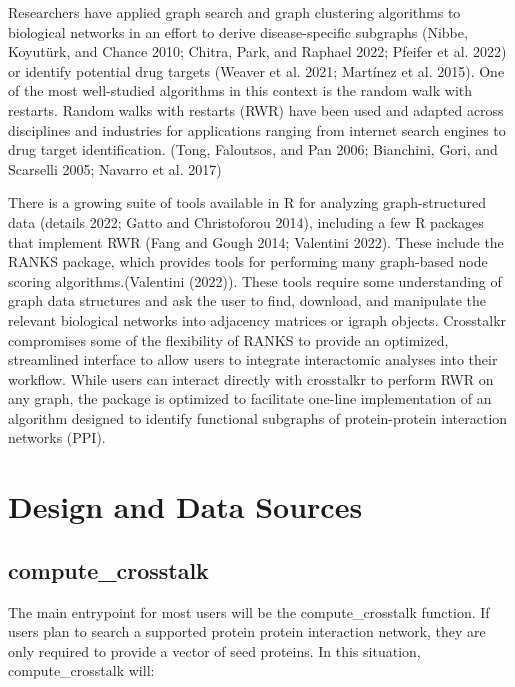 \documentclass{article}
\begin{document}
Researchers have applied graph search and graph clustering algorithms to
biological networks in an effort to derive disease-specific subgraphs
(Nibbe, Koyutürk, and Chance 2010; Chitra, Park, and Raphael 2022;
Pfeifer et al. 2022) or identify potential drug targets (Weaver et al.
2021; Martínez et al. 2015). One of the most well-studied algorithms in
this context is the random walk with restarts. Random walks with
restarts (RWR) have been used and adapted across disciplines and
industries for applications ranging from internet search engines to drug
target identification. (Tong, Faloutsos, and Pan 2006; Bianchini, Gori,
and Scarselli 2005; Navarro et al. 2017)

There is a growing suite of tools available in R for analyzing
graph-structured data (details 2022; Gatto and Christoforou 2014),
including a few R packages that implement RWR (Fang and Gough 2014;
Valentini 2022). These include the RANKS package, which provides tools
for performing many graph-based node scoring algorithms.(Valentini
(2022)). These tools require some understanding of graph data structures
and ask the user to find, download, and manipulate the relevant
biological networks into adjacency matrices or igraph objects.
Crosstalkr compromises some of the flexibility of RANKS to provide an
optimized, streamlined interface to allow users to integrate
interactomic analyses into their workflow. While users can interact
directly with crosstalkr to perform RWR on any graph, the package is
optimized to facilitate one-line implementation of an algorithm designed
to identify functional subgraphs of protein-protein interaction networks
(PPI).

\hypertarget{design-and-data-sources}{%
\section{Design and Data Sources}\label{design-and-data-sources}}

\hypertarget{compute_crosstalk}{%
\subsection{compute\_crosstalk}\label{compute_crosstalk}}

The main entrypoint for most users will be the compute\_crosstalk
function. If users plan to search a supported protein protein
interaction network, they are only required to provide a vector of seed
proteins. In this situation, compute\_crosstalk will:
\end{document}
